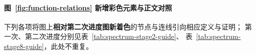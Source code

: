 \clearpage
\begin{figure}[p]
\centering
\def\spectrumStage{16}
\resizebox{\textwidth}{!}{%
%
}
\end{figure}
\clearpage
\noindent
{}
\label{fig:function-relations}

\paragraph{图~\ref{fig:function-relations} 新增彩色元素与正文对照}
下列各项将图上\textbf{相对第二次进度图新着色}的节点与连线引向相应定义与证明；
第一次、第二次进度分别见表~\ref{tab:spectrum-stage2-guide}、
表~\ref{tab:spectrum-stage8-guide}，此处不重复。

